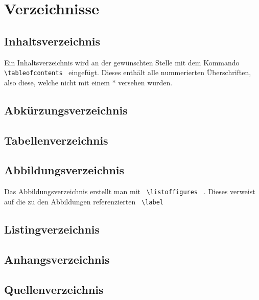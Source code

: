 \section{Verzeichnisse}
\subsection{Inhaltsverzeichnis}
Ein Inhaltsverzeichnis wird an der gewünschten Stelle mit dem Kommando 
\lstinline$ \tableofcontents $ eingefügt. Dieses enthält alle nummerierten 
Überschriften, also diese, welche nicht mit einem $*$ versehen wurden.
\subsection{Abkürzungsverzeichnis}

\subsection{Tabellenverzeichnis}
\subsection{Abbildungsverzeichnis}
Das Abbildungsverzeichnis erstellt man mit \lstinline$ \listoffigures $ . 
Dieses verweist auf die zu den Abbildungen referenzierten \lstinline$ \label $
\subsection{Listingverzeichnis}
\subsection{Anhangsverzeichnis}
\subsection{Quellenverzeichnis}



\listoftables %
\lstlistoflistings %
